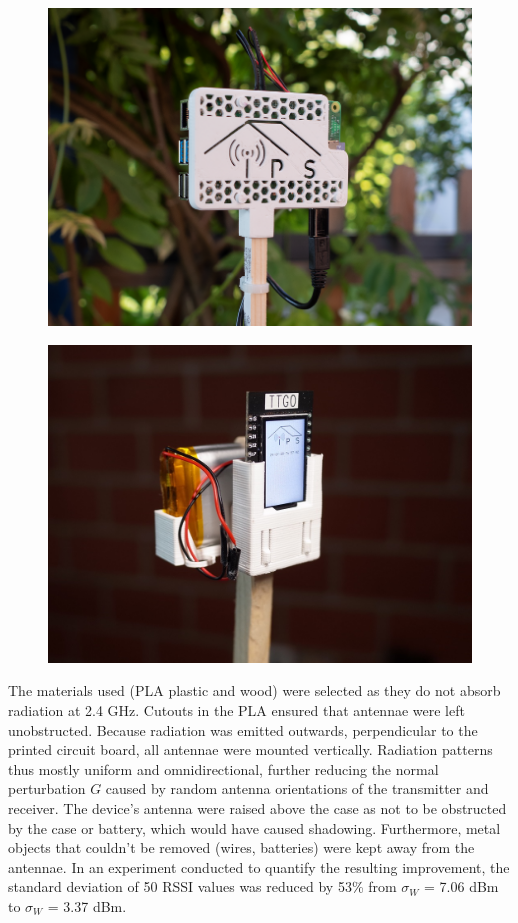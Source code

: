 \documentclass[a4paper, oneside]{ipsreport}
\begin{document}
\begin{figure}[h]
	\begin{minipage}{.5\textwidth}
		\centering
		\includegraphics[width=0.95\linewidth]{./figures/raspi4.png}
		\label{fig:raspi4modelb}
	\end{minipage}
	\begin{minipage}{.5\textwidth}
		\centering
		\includegraphics[width=0.95\linewidth]{./figures/beacon.jpg}
		\label{fig:beacon}
	\end{minipage}
\end{figure}

The materials used (PLA plastic and wood) were selected as they do not absorb radiation at 2.4 GHz. Cutouts in the PLA ensured that antennae were left unobstructed. Because radiation was emitted outwards, perpendicular to the printed circuit board, all antennae were mounted vertically. Radiation patterns thus mostly uniform and omnidirectional, further reducing the normal perturbation $G$ caused by random antenna orientations of the transmitter and receiver. The device's antenna were raised above the case as not to be obstructed by the case or battery, which would have caused shadowing. Furthermore, metal objects that couldn't be removed (wires, batteries) were kept away from the antennae. In an experiment conducted to quantify the resulting improvement, the standard deviation of 50 RSSI values was reduced by 53\% from $\sigma_W$ = 7.06 dBm to $\sigma_W$ = 3.37 dBm.
\end{document}
